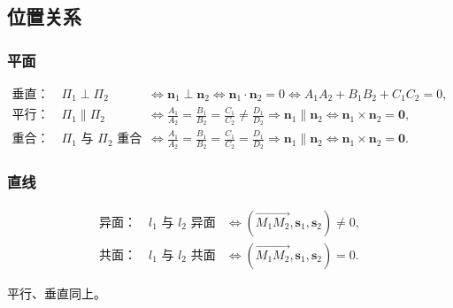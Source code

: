\documentclass[UTF8,fontset=fandol,zihao=5]{ctexart}
\begin{document}
\subsection{位置关系}

\subsubsection{平面}

\begin{align*}
\text{垂直：}\quad
\Pi_1\perp\Pi_2
&\Longleftrightarrow \bm n_1\perp\bm n_2
\Longleftrightarrow \bm n_1\cdot\bm n_2=0
\Longleftrightarrow A_1A_2+B_1B_2+C_1C_2=0,\\[0.6em]
\text{平行：}\quad
\Pi_1\parallel\Pi_2
&\Longleftrightarrow
\frac{A_1}{A_2}=\frac{B_1}{B_2}=\frac{C_1}{C_2}\ne\frac{D_1}{D_2}
\Longrightarrow \bm n_1\parallel\bm n_2
\Longleftrightarrow \bm n_1\times\bm n_2=\bm 0,\\[0.6em]
\text{重合：}\quad
\Pi_1\text{ 与 }\Pi_2\text{ 重合}
&\Longleftrightarrow
\frac{A_1}{A_2}=\frac{B_1}{B_2}=\frac{C_1}{C_2}=\frac{D_1}{D_2}
\Longrightarrow \bm n_1\parallel\bm n_2
\Longleftrightarrow \bm n_1\times\bm n_2=\bm 0.
\end{align*}

\subsubsection{直线}

\begin{align*}
\text{异面：}\quad
l_1\text{ 与 }l_2\text{ 异面}
&\Longleftrightarrow (\overrightarrow{M_1M_2},\bm s_1,\bm s_2)\ne0,\\
\text{共面：}\quad
l_1\text{ 与 }l_2\text{ 共面}
&\Longleftrightarrow (\overrightarrow{M_1M_2},\bm s_1,\bm s_2)=0.
\end{align*}

平行、垂直同上。
\end{document}
